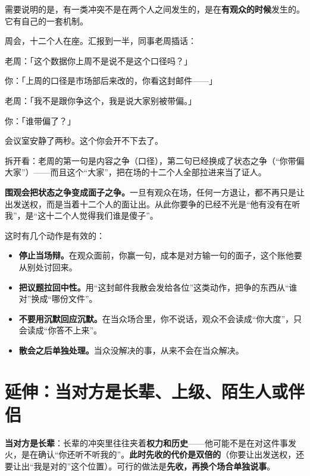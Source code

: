 需要说明的是，有一类冲突不是在两个人之间发生的，是在\textbf{有观众的时候}发生的。它有自己的一套机制。

\par
\begin{mdquote}
周会，十二个人在座。汇报到一半，同事老周插话：\par
\vspace{0.3\baselineskip}
老周：「这个数据你上周不是说不是这个口径吗？」\par
你：「上周的口径是市场部后来改的，你看这封邮件——」\par
老周：「我不是跟你争这个，我是说大家别被带偏。」\par
你：「谁带偏了？」\par
\vspace{0.3\baselineskip}
会议室安静了两秒。这个你会开不下去了。
\end{mdquote}

拆开看：老周的第一句是内容之争（口径），第二句已经换成了状态之争（“你带偏大家”）——而且这个“大家”，把在场的十二个人全部拉进来当了证人。

\textbf{围观会把状态之争变成面子之争。}一旦有观众在场，任何一方退让，都不再只是让出发送权，而是当着十二个人的面让出。从此你要争的已经不光是“他有没有在听我”，是“这十二个人觉得我们谁是傻子”。

这时有几个动作是有效的：

\begin{itemize}
\item \textbf{停止当场辩。}在观众面前，你赢一句，成本是对方输一句的面子，这个账他要从别处讨回来。
\item \textbf{把议题拉回中性。}用“这封邮件我散会发给各位”这类动作，把争的东西从“谁对”换成“哪份文件”。
\item \textbf{不要用沉默回应沉默。}在当众场合里，你不说话，观众不会读成“你大度”，只会读成“你答不上来”。
\item \textbf{散会之后单独处理。}当众没解决的事，从来不会在当众解决。
\end{itemize}

\section{延伸：当对方是长辈、上级、陌生人或伴侣}

\textbf{当对方是长辈}：长辈的冲突里往往夹着\textbf{权力和历史}——他可能不是在对这件事发火，是在确认“你还听不听我的”。\textbf{此时先收的代价是双倍的}（你要让出发送权，还要让出“我是对的”这个位置）。可行的做法是\textbf{先收，再换个场合单独说事}。

